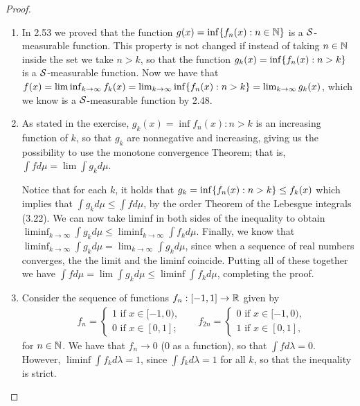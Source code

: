 \begin{proof}
\begin{enumerate}
    \item In 2.53 we proved that the function $g(x) = \inf\{f_n(x): n \in \mathbb{N}\}$ is a $\mathcal{S}$-measurable function.
    This property is not changed if instead of taking $n \in \mathbb{N}$ inside the set we take $n > k$, so that the function $g_k(x) = \inf\{f_n(x): n > k\}$ is a $\mathcal{S}$-measurable function.
    Now we have that $f(x) = \liminf_{k \to \infty} f_k(x) = \lim_{k \to \infty} \inf \{f_n(x): n > k\} = \lim_{k\to \infty} g_k(x)$, which we know is a $\mathcal{S}$-measurable function by 2.48.
    \item As stated in the exercise, $g_k(x) = \inf{f_n(x): n > k}$ is an increasing function of $k$, so that $g_k$ are nonnegative and increasing, giving us the possibility to use the monotone convergence Theorem;
    that is, $\int f d\mu = \lim \int g_k d\mu$.
    
    Notice that for each $k$, it holds that $g_k = \inf \{f_n(x): n > k\} \leq f_k(x)$ which implies that $\int g_k d\mu \leq \int f d\mu$, by the order Theorem of the Lebesgue integrals (3.22).
    We can now take liminf in both sides of the inequality to obtain $\liminf_{k \to \infty} \int g_k d\mu \leq \liminf_{k \to \infty} \int f_k d\mu$.
    Finally, we know that $\liminf_{k \to \infty} \int g_k d\mu = \lim_{k \to \infty}\int g_k d\mu$, since when a sequence of real numbers converges, the the limit and the liminf coincide.
    Putting all of these together we have $\int f d\mu = \lim \int g_k d\mu \leq \liminf \int f_k d\mu$, completing the proof.
    \item Consider the sequence of functions $f_n: [-1,1] \to \mathbb{R}$ given by
    \begin{align*}
        &f_n
        = \begin{cases}
            1 \text{ if } x \in [-1, 0),\\
            0 \text{ if } x \in [0, 1];
        \end{cases}
        &&f_{2n}
        = \begin{cases}
            0 \text{ if } x \in [-1, 0),\\
            1 \text{ if } x \in [0, 1],
        \end{cases}
    \end{align*}
    for $n \in \mathbb{N}$.
    We have that $f_n \to 0$ (0 as a function), so that $\int f d\lambda = 0$.
    However, $\liminf \int f_k d\lambda = 1$, since $\int f_k d\lambda = 1$ for all $k$, so that the inequality is strict.
\end{enumerate}
\end{proof} 

